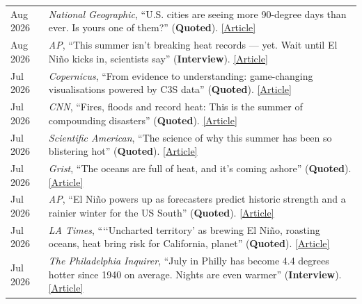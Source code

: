 \documentclass[margin,line,palatino,courier,10pt]{res}
\begin{document}
\begin{resume}
\begin{tabular}{@{}p{0.9in}p{4in}}
Aug 2026 & \textit{National Geographic}, ``U.S. cities are seeing more 90-degree days than ever. Is yours one of them?'' (\textbf{Quoted}). \href{https://www.nationalgeographic.com/environment/article/increase-extreme-heat-days-climate-change}{[Article]}\\
Aug 2026 & \textit{AP}, ``This summer isn’t breaking heat records — yet. Wait until El Ni\~{n}o kicks in, scientists say'' (\textbf{Interview}). \href{https://apnews.com/article/warming-heat-climate-change-summer-el-nino-ffd31dd358a894667c63f4c0a21cd677}{[Article]}\\
Jul 2026 & \textit{Copernicus}, ``From evidence to understanding: game-changing visualisations powered by C3S data'' (\textbf{Quoted}). \href{https://climate.copernicus.eu/evidence-understanding-game-changing-visualisations-powered-c3s-data}{[Article]}\\
Jul 2026 & \textit{CNN}, ``Fires, floods and record heat: This is the summer of compounding disasters'' (\textbf{Quoted}). \href{https://www.cnn.com/2026/07/20/climate/climate-compounding-disasters-summer}{[Article]}\\
Jul 2026 & \textit{Scientific American}, ``The science of why this summer has been so blistering hot'' (\textbf{Quoted}). \href{https://www.scientificamerican.com/article/why-have-there-been-so-many-record-breaking-heat-waves-this-summer/}{[Article]}\\
Jul 2026 & \textit{Grist}, ``The oceans are full of heat, and it's coming ashore'' (\textbf{Quoted}). \href{https://grist.org/climate/heatwaves-oceans-record-temperatures-el-nino/}{[Article]}\\
Jul 2026 & \textit{AP}, ``El Ni\~{n}o powers up as forecasters predict historic strength and a rainier winter for the US South'' (\textbf{Quoted}). \href{https://apnews.com/article/el-nino-climate-change-wetter-winter-heat-45ac1d144e3d34c791294c0ec9df7fb2}{[Article]}\\
Jul 2026 & \textit{LA Times}, ```‘Uncharted territory' as brewing El Niño, roasting oceans, heat bring risk for California, planet'' (\textbf{Quoted}). \href{https://www.latimes.com/california/story/2026-07-06/el-nino-warming-oceans-push-california-plant-into-uncharted-territory}{[Article]}\\
Jul 2026 & \textit{The Philadelphia Inquirer}, ``July in Philly has become 4.4 degrees hotter since 1940 on average. Nights are even warmer'' (\textbf{Interview}). \href{https://www.inquirer.com/news/philadelphia/hot-julys-philadelphia-climate-change-20260702.html}{[Article]}\\

\end{tabular}
\end{resume}
\end{document}
